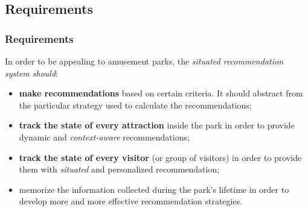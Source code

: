 \subsection{Requirements}\label{subsec:requirements}
\begin{frame}
    \frametitle{Requirements}
    In order to be appealing to amusement parks, the \textit{situated recommendation system should}:
    \begin{itemize}
        \item \textbf{make recommendations} based on certain criteria.
        It should abstract from the particular strategy used to calculate the recommendations;
        \item \textbf{track the state of every attraction} inside the park in order to provide dynamic and \textit{context-aware} recommendations;
        \item \textbf{track the state of every visitor} (or group of visitors) in order to provide them with \textit{situated} and personalized recommendation;
        \item memorize the information collected during the park's lifetime in order to develop more and more effective recommendation strategies.
    \end{itemize}
\end{frame}
